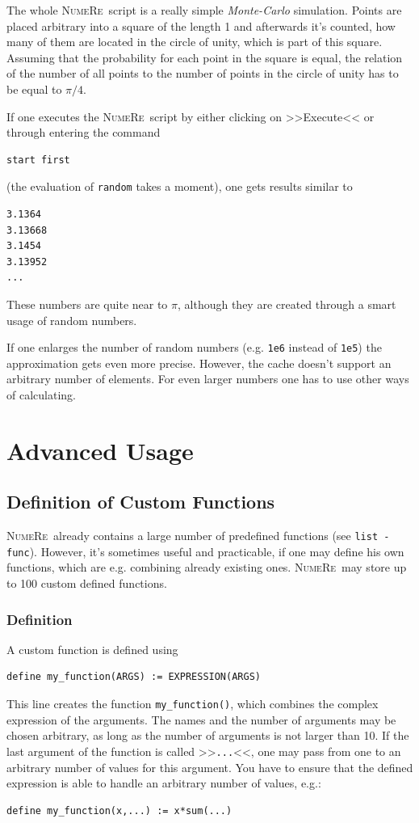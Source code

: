 \documentclass[DIV=14,headsepline,footsepline]{scrbook}
\newcommand{\NR}{\textsc{Nu\-me\-Re}}
\begin{document}
				The whole \NR\ script is a really simple \emph{Monte-Carlo} simulation. Points are placed arbitrary into a square of the length 1 and afterwards it's counted, how many of them are located in the circle of unity, which is part of this square. Assuming that the probability for each point in the square is equal, the relation of the number of all points to the number of points in the circle of unity has to be equal to $\pi/4$.
				
				If one executes the \NR\ script by either clicking on >>Execute<< or through entering the command
				\begin{lstlisting}
start first
				\end{lstlisting}
				(the evaluation of \verb+random+ takes a moment), one gets results similar to
				\begin{lstlisting}
3.1364
3.13668
3.1454
3.13952
...
				\end{lstlisting}
				These numbers are quite near to $\pi$, although they are created through a smart usage of random numbers.
				
				If one enlarges the number of random numbers (e.g. \verb+1e6+ instead of \verb+1e5+) the approximation gets even more precise. However, the cache doesn't support an arbitrary number of elements. For even larger numbers one has to use other ways of calculating.
	\part{Advanced Usage}
		\chapter{Definition of Custom Functions}
			\NR\ already contains a large number of predefined functions (see \verb+list -func+). However, it's sometimes useful and practicable, if one may define his own functions, which are e.g. combining already existing ones. \NR\ may store up to 100 custom defined functions.
			\section{Definition}
				A custom function is defined using
				\begin{lstlisting}
define my_function(ARGS) := EXPRESSION(ARGS)
				\end{lstlisting}
				This line creates the function \verb+my_function()+, which combines the complex expression of the arguments. The names and the number of arguments may be chosen arbitrary, as long as the number of arguments is not larger than 10. If the last argument of the function is called >>\verb+...+<<, one may pass from one to an arbitrary number of values for this argument. You have to ensure that the defined expression is able to handle an arbitrary number of values, e.g.:
				\begin{lstlisting}
define my_function(x,...) := x*sum(...)
				\end{lstlisting}
				
\end{document}
